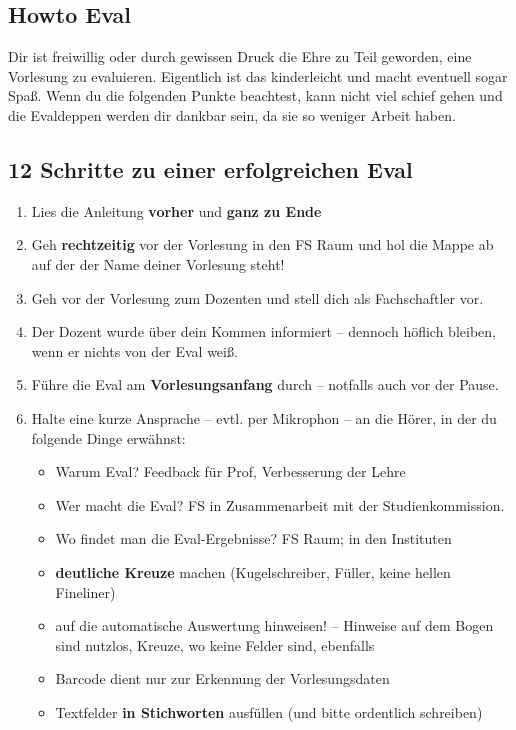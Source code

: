 \documentclass[a4paper,10pt]{article}
\begin{document}
\subsection*{Howto Eval}
Dir ist freiwillig oder durch gewissen Druck die Ehre zu Teil
geworden, eine Vorlesung zu evaluieren. Eigentlich ist das
kinderleicht und macht eventuell sogar Spaß. Wenn du die folgenden
Punkte beachtest, kann nicht viel schief gehen und die Evaldeppen
werden dir dankbar sein, da sie so weniger Arbeit haben.

\subsection*{12 Schritte zu einer erfolgreichen Eval}
\begin{enumerate}
\item Lies die Anleitung \textbf{vorher} und \textbf{ganz zu Ende}
\item Geh \textbf{rechtzeitig} vor der Vorlesung in den FS Raum und hol die
  Mappe ab auf der der Name deiner Vorlesung steht!
\item Geh vor der Vorlesung zum Dozenten und stell dich als
  Fachschaftler vor.
\item Der Dozent wurde über dein Kommen informiert -- dennoch höflich
  bleiben, wenn er nichts von der Eval weiß.
\item Führe die Eval am \textbf{Vorlesungsanfang} durch -- notfalls auch vor der Pause.
\item Halte eine kurze Ansprache -- evtl. per Mikrophon -- an die
  Hörer, in der du folgende Dinge erwähnst:
    \begin{itemize}
    \item Warum Eval? Feedback für Prof, Verbesserung der Lehre
    \item Wer macht die Eval? FS in Zusammenarbeit mit der
          Studienkommission.
    \item Wo findet man die Eval-Ergebnisse? FS Raum; in den
          Instituten
    \item \textbf{deutliche Kreuze} machen (Kugelschreiber, Füller, keine
          hellen Fineliner)
    \item auf die automatische Auswertung hinweisen! -- Hinweise
          auf dem Bogen sind nutzlos, Kreuze, wo keine Felder sind,
          ebenfalls
    \item Barcode dient nur zur Erkennung der Vorlesungsdaten
    \item Textfelder \textbf{in Stichworten} ausfüllen (und bitte ordentlich schreiben)

\end{itemize}
\end{enumerate}
\end{document}

